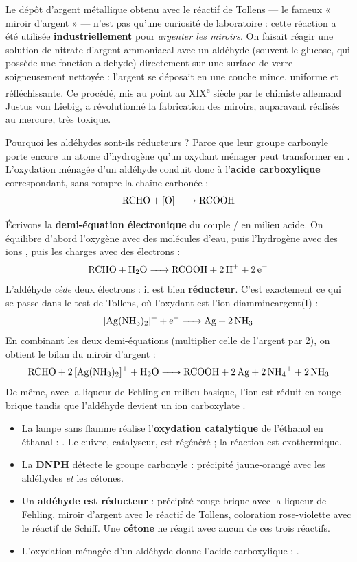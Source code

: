 \documentclass[11pt]{article}
\newcounter{popsec}
\newcounter{popsub}
\newcommand{\courssub}[1]{%
  \stepcounter{popsub}%
  \par\vspace{9pt}\noindent{\popxbold\fontsize{11.5}{13}\selectfont\color{popink}{\color{poporange}\thepopsec.\thepopsub}\hspace{6pt}#1}\par\nopagebreak\vspace{4pt}
}
\begin{document}
\begin{savaistu}
Le dépôt d'argent métallique obtenu avec le réactif de Tollens — le fameux « miroir d'argent » — n'est pas qu'une curiosité de laboratoire : cette réaction a été utilisée \textbf{industriellement} pour \emph{argenter les miroirs}. On faisait réagir une solution de nitrate d'argent ammoniacal avec un aldéhyde (souvent le glucose, qui possède une fonction aldehyde) directement sur une surface de verre soigneusement nettoyée : l'argent se déposait en une couche mince, uniforme et réfléchissante. Ce procédé, mis au point au XIX\textsuperscript{e} siècle par le chimiste allemand Justus von Liebig, a révolutionné la fabrication des miroirs, auparavant réalisés au mercure, très toxique.
\end{savaistu}

\courssub{Oxydation ménagée des aldéhydes}

Pourquoi les aldéhydes sont-ils réducteurs ? Parce que leur groupe carbonyle porte encore un atome d'hydrogène  qu'un oxydant ménager peut transformer en . L'oxydation ménagée d'un aldéhyde conduit donc à l'\textbf{acide carboxylique} correspondant, sans rompre la chaîne carbonée :
\[ \ce{RCHO + [O] -> RCOOH} \]

Écrivons la \textbf{demi-équation électronique} du couple / en milieu acide. On équilibre d'abord l'oxygène avec des molécules d'eau, puis l'hydrogène avec des ions , puis les charges avec des électrons :
\[ \ce{RCHO + H2O -> RCOOH + 2 H+ + 2 e-} \]
L'aldéhyde \emph{cède} deux électrons : il est bien \textbf{réducteur}. C'est exactement ce qui se passe dans le test de Tollens, où l'oxydant est l'ion diammineargent(I) :
\[ \ce{[Ag(NH3)2]+ + e- -> Ag + 2 NH3} \]
En combinant les deux demi-équations (multiplier celle de l'argent par 2), on obtient le bilan du miroir d'argent :
\[ \ce{RCHO + 2 [Ag(NH3)2]+ + H2O -> RCOOH + 2 Ag + 2 NH4+ + 2 NH3} \]
De même, avec la liqueur de Fehling en milieu basique, l'ion  est réduit en  rouge brique tandis que l'aldéhyde devient un ion carboxylate .

\begin{aretenir}
\begin{itemize}
\item La lampe sans flamme réalise l'\textbf{oxydation catalytique} de l'éthanol en éthanal : . Le cuivre, catalyseur, est régénéré ; la réaction est exothermique.
\item La \textbf{DNPH} détecte le groupe carbonyle : précipité jaune-orangé avec les aldéhydes \emph{et} les cétones.
\item Un \textbf{aldéhyde est réducteur} : précipité rouge brique avec la liqueur de Fehling, miroir d'argent avec le réactif de Tollens, coloration rose-violette avec le réactif de Schiff. Une \textbf{cétone} ne réagit avec aucun de ces trois réactifs.
\item L'oxydation ménagée d'un aldéhyde donne l'acide carboxylique : .
\end{itemize}
\end{aretenir}
\end{document}
